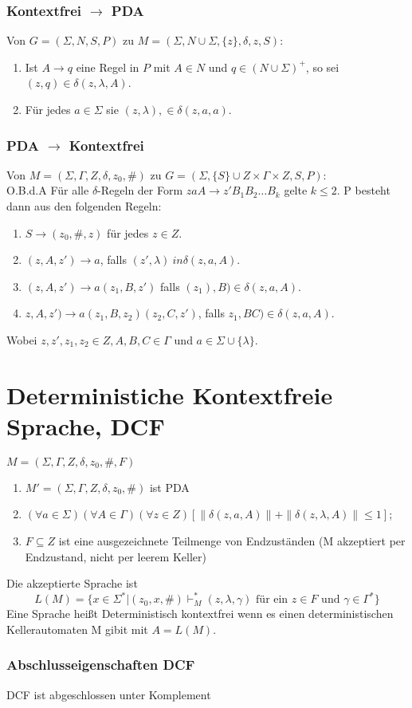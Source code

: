 \documentclass[9pt]{article}
\begin{document}
 \subsubsection{Kontextfrei $\to$ PDA}
 Von $G = (\Sigma, N, S, P)$ zu $M = (\Sigma, N\cup\Sigma, \{z\}, \delta, z, S)$:
 \begin{enumerate}
 	\item Ist $A \to q$ eine Regel in $P$ mit $A \in N$ und $q \in (N \cup \Sigma)^+$, so sei $(z, q) \in \delta(z, \lambda, A)$.
 	\item Für jedes $a \in \Sigma$ sie $(z, \lambda), \in \delta(z, a, a)$.
 \end{enumerate}
\subsubsection{PDA $\to$ Kontextfrei}
 Von $M = (\Sigma, \Gamma, Z, \delta, z_0, \#)$ zu $G = (\Sigma, \{S\} \cup Z \times \Gamma \times Z, S, P)$:\\
 O.B.d.A Für alle $\delta$-Regeln der Form $zaA \to z'B_1B_2\dots B_k$ gelte $k \le 2$.
 P besteht dann aus den folgenden Regeln:
 \begin{enumerate}
 	\item $S \to (z_0, \#, z)$ für jedes $z \in Z$.
 	\item $(z, A, z') \to a$, falls $(z', \lambda) \ in \delta(z, a, A)$.
 	\item $(z, A, z') \to a(z_1, B, z')$ falls $(z_1), B) \in \delta(z, a, A)$.
 	\item $z, A, z') \to a(z_1, B, z_2)(z_2, C, z')$, falls $z_1, BC) \in \delta(z, a, A)$.
 \end{enumerate}
 Wobei $z, z', z_1, z_2 \in Z, A, B, C \in \Gamma$ und $a \in \Sigma \cup \{\lambda\}$.
\section{Deterministiche Kontextfreie Sprache, DCF}
$M = (\Sigma, \Gamma, Z, \delta, z_0, \#, F)$
\begin{enumerate}
	\item $M' = (\Sigma, \Gamma, Z, \delta, z_0, \#)$ ist PDA
	\item $(\forall a \in \Sigma)(\forall A \in \Gamma)(\forall z \in Z)[\|\delta(z, a, A)\| + \|\delta(z, \lambda, A)\| \le 1]$;
	\item $F \subseteq Z$ ist eine ausgezeichnete Teilmenge von Endzuständen (M akzeptiert per Endzustand, nicht per leerem Keller)
\end{enumerate}
Die akzeptierte Sprache ist
$$L(M) = \{x \in \Sigma^*|(z_0, x, \#)\vdash^*_M (z, \lambda, \gamma) \text{ für ein } z \in F \text{ und } \gamma \in \Gamma^*\}$$
Eine Sprache heißt Deterministisch kontextfrei wenn es einen deterministischen Kellerautomaten M gibit mit $A = L(M)$.
\subsubsection{Abschlusseigenschaften DCF}
DCF ist abgeschlossen unter Komplement
\end{document}
